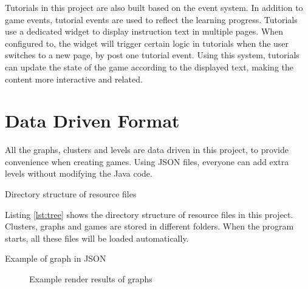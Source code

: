 \documentclass[msc,deptreport, cs]{infthesis}
\begin{document}
Tutorials in this project are also built based on the event system. In addition to game events, tutorial events are used to reflect the learning progress. Tutorials use a dedicated widget to display instruction text in multiple pages. When configured to, the widget will trigger certain logic in tutorials when the user switches to a new page, by post one tutorial event. Using this system, tutorials can update the state of the game according to the displayed text, making the content more interactive and related.

\section{Data Driven Format} \label{sec:format}

All the graphs, clusters and levels are data driven in this project, to provide convenience when creating games. Using JSON files, everyone can add extra levels without modifying the Java code.

\vspace{0.5em}
\begin{lstfloat}
  
  \caption{Directory structure of resource files}
  \label{lst:tree}
  \vspace{-1em}
\end{lstfloat}
\vspace{-0.5em}

Listing \ref{lst:tree} shows the directory structure of resource files in this project. Clusters, graphs and games are stored in different folders. When the program starts, all these files will be loaded automatically.

\vspace{0.5em}
\begin{lstfloat}[!htb]
  
  \caption{Example of graph in JSON}
  \label{lst:graph}
  \vspace{-1em}
\end{lstfloat}
\vspace{-0.5em}

\begin{figure}[!htb]
  \centering
   \hspace{2em}
  \caption{Example render results of graphs}
  \label{fig:json}
\end{figure}
\end{document}
